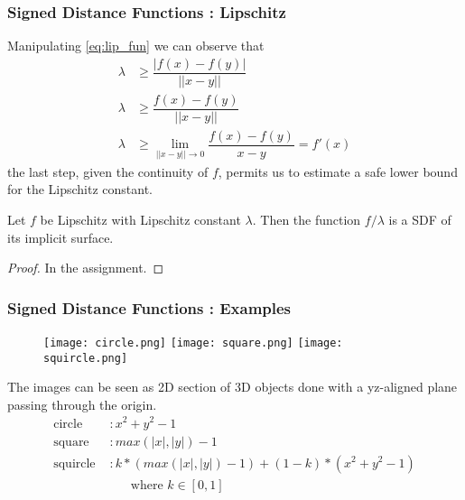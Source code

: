 \documentclass{beamer}
\newcommand{\abs}[1]{\lvert #1 \lvert}
\newcommand{\norm}[1]{\lvert\lvert #1 \lvert\lvert}
\begin{document}
\begin{frame}
\frametitle{Signed Distance Functions : Lipschitz}
Manipulating \autoref{eq:lip_fun} we can observe that
\begin{align*}
  \lambda &\geq \dfrac{\abs{f(x) - f(y)}}{\norm{x - y}} \\
  \lambda &\geq \dfrac{f(x) - f(y)}{\norm{x - y}} \\ %
  \lambda &\geq \lim_{\norm{x-y} \to 0} \dfrac{f(x) - f(y)}{x - y} = f'(x)
\end{align*}
the last step, given the continuity of $f$, permits us to estimate a safe lower bound for the Lipschitz constant.

\begin{theorem}
  Let $f$ be Lipschitz with Lipschitz constant $\lambda$.
  Then the function $f / \lambda$ is a SDF of its implicit surface.
\end{theorem}
\begin{proof}
  In the assignment.
\end{proof}
\end{frame}

\begin{frame}
\frametitle{Signed Distance Functions : Examples}

\begin{figure}[!htb]
  \texttt{[image: circle.png]}
\endminipage\hfill
{}
  \texttt{[image: square.png]}
\endminipage\hfill
{}%
  \texttt{[image: squircle.png]}
\endminipage
\end{figure}

The images can be seen as 2D section of 3D objects done with a yz-aligned plane passing through the origin.
\begin{align*}
  \text{circle }  &: x^2 + y^2 - 1 \\
  \text{square }  &: max(\abs{x}, \abs{y}) - 1 \\
  \text{squircle }&: k * (max(\abs{x}, \abs{y}) - 1) + (1-k) * (x^2 + y^2 - 1)\\
                  &\;\;\;\;\;\;\text{where $k \in [0,1]$}
\end{align*}
\end{frame}
\end{document}
